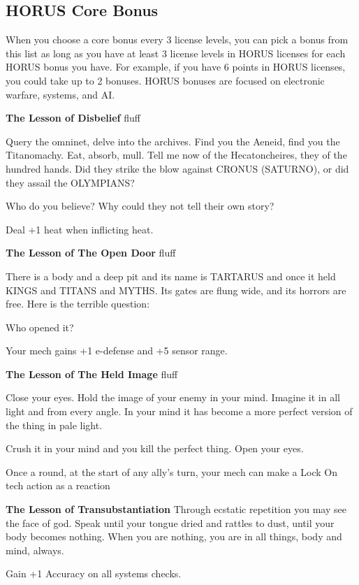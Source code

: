 \subsection{HORUS Core Bonus}

When you choose a core bonus every 3 license levels, you can pick a bonus from this list as long as you have at least 3 license levels in HORUS licenses for each HORUS bonus you have. For example, if you have 6 points in HORUS licenses, you could take up to 2 bonuses. HORUS bonuses are focused on electronic warfare, systems, and AI.

\textbf{The Lesson of Disbelief}\newline
fluff{Query the omninet, delve into the archives. Find you the Aeneid, find you the Titanomachy. Eat, absorb, mull. Tell me now of the Hecatoncheires, they of the hundred hands. Did they strike the blow against CRONUS (SATURNO), or did they assail the OLYMPIANS?

Who do you believe? Why could they not tell their own story?}

Deal +1 heat when inflicting heat.


\textbf{The Lesson of The Open Door}\newline
fluff{There is a body and a deep pit and its name is TARTARUS and once it held KINGS and TITANS and MYTHS. Its gates are flung wide, and its horrors are free. Here is the terrible question:

Who opened it?}

Your mech gains +1 e-defense and +5 sensor range.


\textbf{The Lesson of The Held Image}\newline
fluff{Close your eyes. Hold the image of your enemy in your mind. Imagine it in all light and from every angle. In your mind it has become a more perfect version of the thing in pale light.

Crush it in your mind and you kill the perfect thing. Open your eyes.}

Once a round, at the start of any ally's turn, your mech can make a Lock On tech action as a reaction


\textbf{The Lesson of Transubstantiation}\newline
{Through ecstatic repetition you may see the face of god. Speak until your tongue dried and rattles to dust, until your body becomes nothing. When you are nothing, you are in all things, body and mind, always.}

Gain +1 Accuracy on all systems checks.

